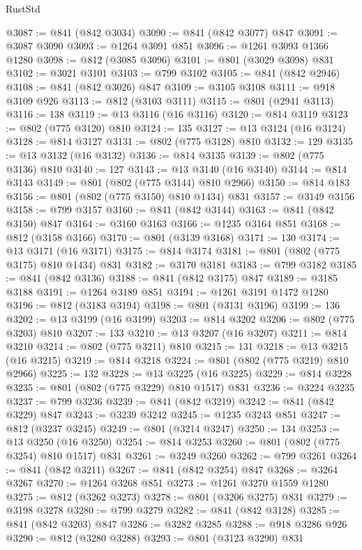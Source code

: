 \begin{lexlean}{RustStd}
\begin{coremodule}
{\begin{coremodule}
{{{{{@3087 := @841 (@842 @3034)
@3090 := @841 (@842 @3077) @847
@3091 := @3087 @3090
@3093 := @1264 @3091 @851
@3096 := @1261 @3093 @1366 @1280
@3098 := @812 (@3085 @3096)
@3101 := @801 (@3029 @3098) @831
@3102 := @3021 @3101
@3103 := @799 @3102
@3105 := @841 (@842 @2946)
@3108 := @841 (@842 @3026) @847
@3109 := @3105 @3108
@3111 := @918 @3109 @926
@3113 := @812 (@3103 @3111)
@3115 := @801 (@2941 @3113)
@3116 := 138
@3119 := @13 @3116 (@16 @3116)
@3120 := @814 @3119
@3123 := @802 (@775 @3120) @810
@3124 := 135
@3127 := @13 @3124 (@16 @3124)
@3128 := @814 @3127
@3131 := @802 (@775 @3128) @810
@3132 := 129
@3135 := @13 @3132 (@16 @3132)
@3136 := @814 @3135
@3139 := @802 (@775 @3136) @810
@3140 := 127
@3143 := @13 @3140 (@16 @3140)
@3144 := @814 @3143
@3149 := @801 (@802 (@775 @3144) @810 @2966)
@3150 := @814 @183
@3156 := @801 (@802 (@775 @3150) @810 @1434) @831
@3157 := @3149 @3156
@3158 := @799 @3157
@3160 := @841 (@842 @3144)
@3163 := @841 (@842 @3150) @847
@3164 := @3160 @3163
@3166 := @1235 @3164 @851
@3168 := @812 (@3158 @3166)
@3170 := @801 (@3139 @3168)
@3171 := 130
@3174 := @13 @3171 (@16 @3171)
@3175 := @814 @3174
@3181 := @801 (@802 (@775 @3175) @810 @1434) @831
@3182 := @3170 @3181
@3183 := @799 @3182
@3185 := @841 (@842 @3136)
@3188 := @841 (@842 @3175) @847
@3189 := @3185 @3188
@3191 := @1264 @3189 @851
@3194 := @1261 @3191 @1472 @1280
@3196 := @812 (@3183 @3194)
@3198 := @801 (@3131 @3196)
@3199 := 136
@3202 := @13 @3199 (@16 @3199)
@3203 := @814 @3202
@3206 := @802 (@775 @3203) @810
@3207 := 133
@3210 := @13 @3207 (@16 @3207)
@3211 := @814 @3210
@3214 := @802 (@775 @3211) @810
@3215 := 131
@3218 := @13 @3215 (@16 @3215)
@3219 := @814 @3218
@3224 := @801 (@802 (@775 @3219) @810 @2966)
@3225 := 132
@3228 := @13 @3225 (@16 @3225)
@3229 := @814 @3228
@3235 := @801 (@802 (@775 @3229) @810 @1517) @831
@3236 := @3224 @3235
@3237 := @799 @3236
@3239 := @841 (@842 @3219)
@3242 := @841 (@842 @3229) @847
@3243 := @3239 @3242
@3245 := @1235 @3243 @851
@3247 := @812 (@3237 @3245)
@3249 := @801 (@3214 @3247)
@3250 := 134
@3253 := @13 @3250 (@16 @3250)
@3254 := @814 @3253
@3260 := @801 (@802 (@775 @3254) @810 @1517) @831
@3261 := @3249 @3260
@3262 := @799 @3261
@3264 := @841 (@842 @3211)
@3267 := @841 (@842 @3254) @847
@3268 := @3264 @3267
@3270 := @1264 @3268 @851
@3273 := @1261 @3270 @1559 @1280
@3275 := @812 (@3262 @3273)
@3278 := @801 (@3206 @3275) @831
@3279 := @3198 @3278
@3280 := @799 @3279
@3282 := @841 (@842 @3128)
@3285 := @841 (@842 @3203) @847
@3286 := @3282 @3285
@3288 := @918 @3286 @926
@3290 := @812 (@3280 @3288)
@3293 := @801 (@3123 @3290) @831
}}}}}
\end{coremodule}}
\end{coremodule}
\end{lexlean}
